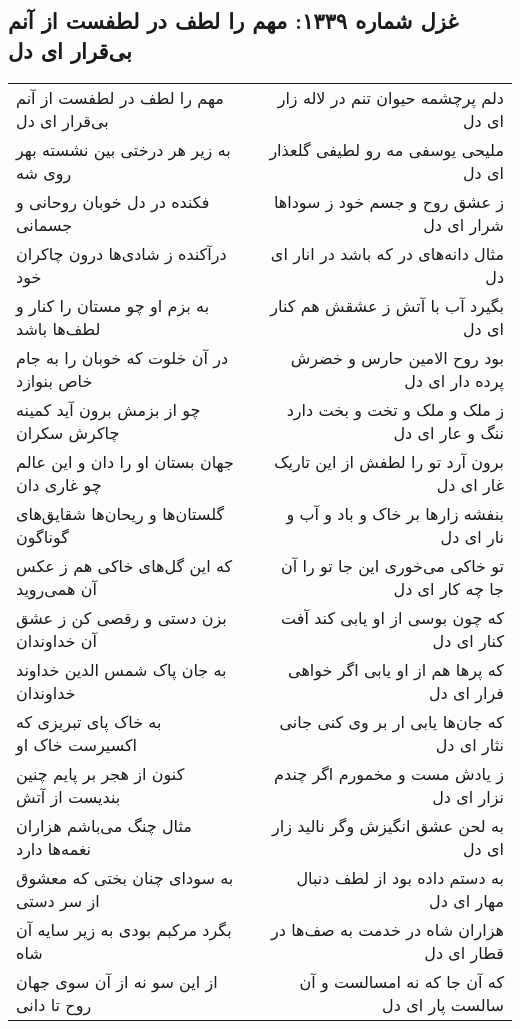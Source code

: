 \begin{center}
\section*{غزل شماره ۱۳۳۹: مهم را لطف در لطفست از آنم بی‌قرار ای دل}
\label{sec:1339}
\begin{longtable}{l p{0.5cm} r}
مهم را لطف در لطفست از آنم بی‌قرار ای دل
&&
دلم پرچشمه حیوان تنم در لاله زار ای دل
\\
به زیر هر درختی بین نشسته بهر روی شه
&&
ملیحی یوسفی مه رو لطیفی گلعذار ای دل
\\
فکنده در دل خوبان روحانی و جسمانی
&&
ز عشق روح و جسم خود ز سوداها شرار ای دل
\\
درآکنده ز شادی‌ها درون چاکران خود
&&
مثال دانه‌های در که باشد در انار ای دل
\\
به بزم او چو مستان را کنار و لطف‌ها باشد
&&
بگیرد آب با آتش ز عشقش هم کنار ای دل
\\
در آن خلوت که خوبان را به جام خاص بنوازد
&&
بود روح الامین حارس و خضرش پرده دار ای دل
\\
چو از بزمش برون آید کمینه چاکرش سکران
&&
ز ملک و ملک و تخت و بخت دارد ننگ و عار ای دل
\\
جهان بستان او را دان و این عالم چو غاری دان
&&
برون آرد تو را لطفش از این تاریک غار ای دل
\\
گلستان‌ها و ریحان‌ها شقایق‌های گوناگون
&&
بنفشه زارها بر خاک و باد و آب و نار ای دل
\\
که این گل‌های خاکی هم ز عکس آن همی‌روید
&&
تو خاکی می‌خوری این جا تو را آن جا چه کار ای دل
\\
بزن دستی و رقصی کن ز عشق آن خداوندان
&&
که چون بوسی از او یابی کند آفت کنار ای دل
\\
به جان پاک شمس الدین خداوند خداوندان
&&
که پرها هم از او یابی اگر خواهی فرار ای دل
\\
به خاک پای تبریزی که اکسیرست خاک او
&&
که جان‌ها یابی ار بر وی کنی جانی نثار ای دل
\\
کنون از هجر بر پایم چنین بندیست از آتش
&&
ز یادش مست و مخمورم اگر چندم نزار ای دل
\\
مثال چنگ می‌باشم هزاران نغمه‌ها دارد
&&
به لحن عشق انگیزش وگر نالید زار ای دل
\\
به سودای چنان بختی که معشوق از سر دستی
&&
به دستم داده بود از لطف دنبال مهار ای دل
\\
بگرد مرکبم بودی به زیر سایه آن شاه
&&
هزاران شاه در خدمت به صف‌ها در قطار ای دل
\\
از این سو نه از آن سوی جهان روح تا دانی
&&
که آن جا که نه امسالست و آن سالست پار ای دل

\end{longtable}
\end{center}
